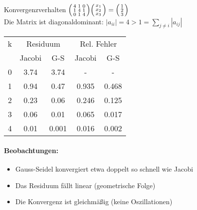 \begin{example2}{Konvergenzverhalten}
$\begin{psmallmatrix}
4 & 1 & 0\\
1 & 4 & 1\\
0 & 1 & 4
\end{psmallmatrix}
\begin{psmallmatrix}
x_1\\
x_2\\
x_3
\end{psmallmatrix} =
\begin{psmallmatrix}
1\\
2\\
3
\end{psmallmatrix}$
\vspace{1mm}\\
Die Matrix ist diagonaldominant:
$|a_{ii}| = 4 > 1 = \sum_{j\neq i} |a_{ij}|$
\vspace{1mm}\\
\begin{tabular}{c|cc|cc}
k & \multicolumn{2}{c|}{Residuum} & \multicolumn{2}{c}{Rel. Fehler}\\
& Jacobi & G-S & Jacobi & G-S\\
\hline
0 & 3.74 & 3.74 & - & -\\
1 & 0.94 & 0.47 & 0.935 & 0.468\\
2 & 0.23 & 0.06 & 0.246 & 0.125\\
3 & 0.06 & 0.01 & 0.065 & 0.017\\
4 & 0.01 & 0.001 & 0.016 & 0.002
\end{tabular}

\paragraph{Beobachtungen:}
\begin{itemize}
    \item Gauss-Seidel konvergiert etwa doppelt so schnell wie Jacobi
    \item Das Residuum fällt linear (geometrische Folge)
    \item Die Konvergenz ist gleichmäßig (keine Oszillationen)
\end{itemize}
\end{example2}














